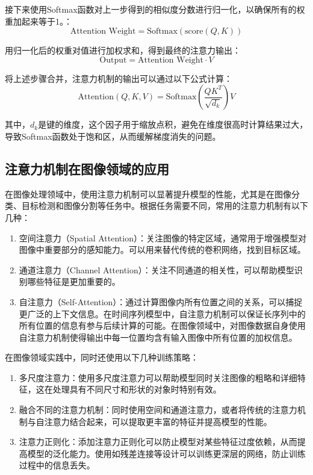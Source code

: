 接下来使用Softmax函数对上一步得到的相似度分数进行归一化，以确保所有的权重加起来等于1。：
\begin{equation}
   \text{Attention Weight} = \text{Softmax}(\text{score}(Q, K))
\end{equation}

用归一化后的权重对值进行加权求和，得到最终的注意力输出：
\begin{equation}
  \text{Output} = \text{Attention Weight} \cdot V 
\end{equation}

将上述步骤合并，注意力机制的输出可以通过以下公式计算：
\begin{equation}
\text{Attention}(Q, K, V) = \text{Softmax}\left(\frac{QK^T}{\sqrt{d_k}}\right)V 
\end{equation}

其中，\(d_k\)是键的维度，这个因子用于缩放点积，避免在维度很高时计算结果过大，导致Softmax函数处于饱和区，从而缓解梯度消失的问题\cite{2023AttentionAllYouNeed}。
\subsection{注意力机制在图像领域的应用}
在图像处理领域中，使用注意力机制可以显著提升模型的性能，尤其是在图像分类、目标检测和图像分割等任务中。根据任务需要不同，常用的注意力机制有以下几种：
\begin{enumerate}    
  \item 空间注意力（Spatial Attention）：关注图像的特定区域，通常用于增强模型对图像中重要部分的感知能力。可以用来替代传统的卷积网络，找到目标区域。
  \item 通道注意力（Channel Attention）：关注不同通道的相关性，可以帮助模型识别哪些特征是更加重要的。
  \item 自注意力（Self-Attention）：通过计算图像内所有位置之间的关系，可以捕捉更广泛的上下文信息。在时间序列模型中，自注意力机制可以保证长序列中的所有位置的信息有参与后续计算的可能。在图像领域中，对图像数据自身使用自注意力机制使得输出中每一位置均含有输入图像中所有位置的加权信息。
\end{enumerate}

在图像领域实践中，同时还使用以下几种训练策略：
\begin{enumerate}    
  \item 多尺度注意力：使用多尺度注意力可以帮助模型同时关注图像的粗略和详细特征，这在处理具有不同尺寸和形状的对象时特别有效。
  \item 融合不同的注意力机制：同时使用空间和通道注意力，或者将传统的注意力机制与自注意力结合起来，可以提取更丰富的特征并提高模型的性能。
  \item 注意力正则化：添加注意力正则化可以防止模型对某些特征过度依赖，从而提高模型的泛化能力。使用如残差连接等设计可以训练更深层的网络，防止训练过程中的信息丢失。
\end{enumerate}

